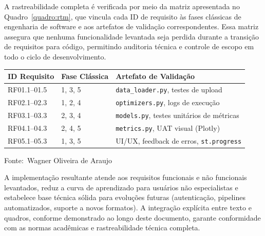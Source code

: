 \documentclass[12pt,a4paper]{article}
\newcommand{\oautor}{Wagner Oliveira de Araujo}
\begin{document}
A rastreabilidade completa é verificada por meio da matriz apresentada no Quadro~\ref{quadro:rtm}, que vincula cada ID de requisito às fases clássicas de engenharia de software e aos artefatos de validação correspondentes. Essa matriz assegura que nenhuma funcionalidade levantada seja perdida durante a transição de requisitos para código, permitindo auditoria técnica e controle de escopo em todo o ciclo de desenvolvimento.

\begin{quadro}[ht]
\centering
\small
\caption{Matriz de rastreabilidade de requisitos (\textit{Requirements Traceability Matrix} - RTM)}
\label{quadro:rtm}
\begin{threeparttable}
\begin{tabularx}{\textwidth}{|l|l|X|} \hline
\textbf{ID Requisito} & \textbf{Fase Clássica} & \textbf{Artefato de Validação} \\ \hline
RF01.1--01.5 & 1, 3, 5 & \texttt{data\_loader.py}, testes de upload \\ \hline
RF02.1--02.3 & 1, 2, 4 & \texttt{optimizers.py}, logs de execução \\ \hline
RF03.1--03.3 & 2, 3, 4 & \texttt{models.py}, testes unitários de métricas \\ \hline
RF04.1--04.3 & 2, 4, 5 & \texttt{metrics.py}, UAT visual (Plotly) \\ \hline
RF05.1--05.3 & 1, 3, 5 & UI/UX, feedback de erros, \texttt{st.progress} \\ \hline
\end{tabularx}
\begin{tablenotes}[flushleft]
\footnotesize
\item Fonte:~\oautor
\end{tablenotes}
\end{threeparttable}
\end{quadro}

A implementação resultante atende aos requisitos funcionais e não funcionais levantados, reduz a curva de aprendizado para usuários não especialistas e estabelece base técnica sólida para evoluções futuras (autenticação, pipelines automatizados, suporte a novos formatos). A integração explícita entre texto e quadros, conforme demonstrado ao longo deste documento, garante conformidade com as normas acadêmicas e rastreabilidade técnica completa.
\end{document}
